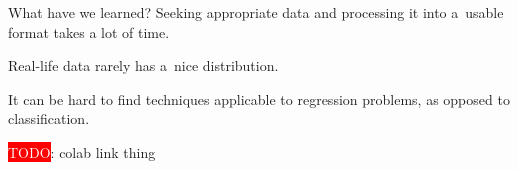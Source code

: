 \documentclass[aspectratio=169,compress,14pt]{beamer}
\newcommand{\TODO}[1]{\colorbox{red}{\textcolor{white}{TODO}}: #1}
\begin{document}
\begin{frame}{What have we learned?}
  Seeking appropriate data and processing it into a~usable format takes a lot of time.
  \vfill\pause

  Real-life data rarely has a~nice distribution.
  \vfill\pause

  It can be hard to find techniques applicable to regression problems, as
  opposed to classification.
\end{frame}

\begin{frame}{}
  \TODO{colab link thing}
\end{frame}
\end{document}
